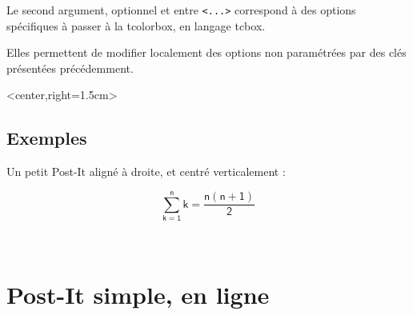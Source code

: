 \documentclass[french,a4paper,11pt]{article}
\begin{document}
\begin{tipblock}
Le second argument, optionnel et entre \texttt{<...>} correspond à des options spécifiques à passer à la \textsf{tcolorbox}, en langage \textsf{tcbox}.

Elles permettent de modifier localement des options non paramétrées par des clés présentées précédemment.
\end{tipblock}

\begin{DemoCode}[]
\begin{PostIt}
	[Couleur=cyan,Attache=Trombone,Largeur=10cm,Inclinaison=10]<center,right=1.5cm>
\lipsum[1][1-3]
\end{PostIt}
\end{DemoCode}

\pagebreak

\subsection{Exemples}

\begin{DemoCode}[]
\begin{wrapstuff}[r,top=1]
\begin{PostIt}[Inclinaison=5,Coin,Couleur=pink,CouleurAttache=blue,Bordure=false]
\lipsum[1][1-2]
\end{PostIt}
\end{wrapstuff}

\lipsum[1]
\end{DemoCode}

\begin{DemoCode}[]
Un petit Post-It aligné à droite, et centré verticalement :
%
\hfill\begin{PostIt}[Inclinaison=-10,Couleur=orange,Largeur=5cm,Hauteur=5cm, AlignementV=center,Coin,CouleurAttache=yellow, DecalAttache=-1cm,AlignementPostIt=center]

\textsf{\small\lipsum[1][1-2]}
\[\mathsf{\displaystyle\sum_{k=1}^{n} k = \dfrac{n(n+1)}{2}}\]

\end{PostIt}
\end{DemoCode}

\vfill~

\pagebreak

\section{Post-It simple, en ligne}
\end{document}
